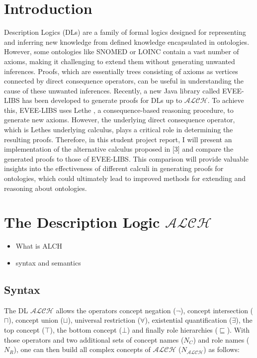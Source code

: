 \documentclass[titlepage]{article}
\begin{document}
\section{Introduction}
Description Logics (DLs) are a family of formal logics designed for representing and inferring new
knowledge from defined knowledge encapsulated in ontologies. However, some ontologies like SNOMED or
LOINC \cite{article}
contain a vast number of axioms, making it challenging to extend them without generating unwanted 
inferences. Proofs, which are essentially trees consisting of axioms as vertices connected by 
direct consequence operators, can be useful in understanding the cause of these unwanted inferences. 
Recently, a new Java library called EVEE-LIBS \cite{https://doi.org/10.48550/arxiv.2206.07711} has been developed to generate proofs for DLs up to 
$\mathcal{ALCH}$. To achieve this, EVEE-LIBS uses Lethe \cite{KoopmannSchmidt15c}, a 
consequence-based reasoning procedure, to generate new axioms. However, the underlying direct 
consequence operator, which is Lethes underlying calculus, 
plays a critical role in determining the resulting proofs. Therefore, in this student project report, 
I will present an implementation of the alternative calculus proposed in [3] and compare the 
generated proofs to those of EVEE-LIBS. This comparison will provide valuable insights into the effectiveness of 
different calculi in generating proofs for ontologies, which could ultimately lead to improved 
methods for extending and reasoning about ontologies.



\section{The Description Logic $\mathcal{ALCH}$}
\begin{itemize}
  \item What is ALCH
  \item syntax and semantics
\end{itemize}

\subsection{Syntax}
The DL $\mathcal{ALCH}$ allows the operators concept negation ($\neg$), 
concept intersection ($\sqcap$), concept union ($\sqcup$), universal restriction
 ($\forall$), existential quantification ($\exists$), the top concept ($\top$),
 the bottom concept ($\bot$) and finally role hierarchies ($\sqsubseteq$).
With those operators and two additional sets of concept names ($N_C$) and role names ($N_R$),
one can then build all complex concepts of $\mathcal{ALCH}$ 
($N_{\mathcal{ALCH}}$) as follows:
\end{document}
